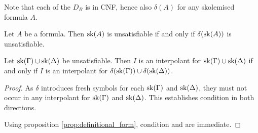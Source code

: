 Note that each of the $D_B$ is in CNF, hence also $\delta(A)$ for any skolemised formula $A$.

\begin{prop}
	\label{prop:definitional_form}
	Let $A$ be a formula. Then $\operatorname{sk}(A)$ is unsatisfiable if and only if $\delta(\operatorname{sk}(A))$ is unsatisfiable.
\end{prop}

\begin{prop}
	Let $\operatorname{sk}(\Gamma) \cup \operatorname{sk}(\Delta)$ be unsatisfiable.
	Then $I$ is an interpolant for \mbox{$\operatorname{sk}(\Gamma) \cup \operatorname{sk}(\Delta)$} if and only if 
	$I$ is an interpolant for $\delta(\operatorname{sk}(\Gamma)) \cup \delta(\operatorname{sk}(\Delta))$.
\end{prop}
\begin{proof}
	As $\delta$ introduces fresh symbols for each $\operatorname{sk}(\Gamma)$ and $\operatorname{sk}(\Delta)$, they must not occur in any interpolant for $\operatorname{sk}(\Gamma)$ and $\operatorname{sk}(\Delta)$. 
	This establishes condition  in both directions.

Using proposition \ref{prop:definitional_form}, condition  and  are immediate.
\end{proof}

